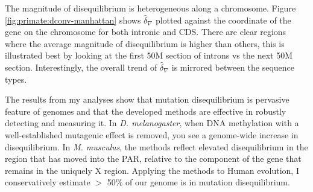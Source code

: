 

The magnitude of disequilibrium is heterogeneous along a chromosome. Figure \ref{fig:primate:dconv-manhattan} shows $\hat \delta_\nabla$ plotted against the coordinate of the gene on the chromosome for both intronic and CDS. There are clear regions where the average magnitude of disequilibrium is higher than others, this is illustrated best by looking at the first 50M section of introns vs the next 50M section. Interestingly, the overall trend of $\hat \delta_\nabla$ is mirrored between the sequence types. 



The results from my analyses show that mutation disequilibrium is pervasive feature of genomes and that the developed methods are effective in robustly detecting and measuring it. In \textit{D. melanogaster}, when DNA methylation with a well-established mutagenic effect is removed, you see a genome-wide increase in disequilibrium. In \textit{M. musculus}, the methods reflect elevated disequilibrium in the region that has moved into the PAR, relative to the component of the gene that remains in the uniquely X region. Applying the methods to Human evolution, I conservatively estimate $>$ 50\% of our genome is in mutation disequilibrium.
